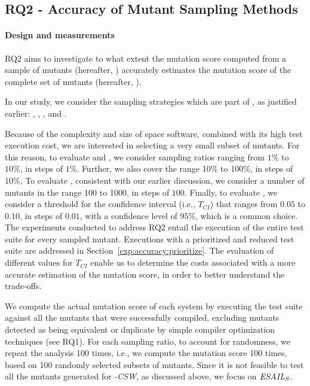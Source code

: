 \subsection{RQ2 - Accuracy of Mutant Sampling Methods}
\label{sec:RQ2}
\paragraph{Design and measurements}


RQ2 aims to investigate  
to what extent the mutation score computed from a sample of mutants (hereafter, ) accurately estimates the mutation score of the complete set of mutants (hereafter, ).

In our study, we consider the sampling strategies which are part of \APPR, as justified earlier: , ,  , and . 


Because of the complexity and size of space software, combined with its high test execution cost, we are interested in selecting a very small subset of mutants. 
For this reason, 
to evaluate   and ,
we consider sampling ratios ranging from $1\%$ to $10\%$, in steps of $1\%$. Further,
 we also cover the range 10\% to 100\%, in steps of $10\%$. To evaluate  , consistent with our earlier discussion, we consider a number of mutants in the range 100 to 1000, in steps of $100$.
Finally, to evaluate , we consider a threshold for the confidence interval (i.e., $T_{\mathit{CI}}$) that ranges from $0.05$ to $0.10$, in steps of $0.01$, with a confidence level of $95\%$, which is a common choice. The experiments conducted to address RQ2 entail the execution of the entire test suite for every sampled mutant. Executions with a prioritized and reduced test suite are addressed in Section~\ref{exp:accuracy:prioritize}. The evaluation of different values for $T_{\mathit{CI}}$ enable us to determine the costs associated with a more accurate estimation of the mutation score, in order to better understand the trade-offs.


We compute the actual mutation score of each system by executing the test suite against all the mutants that were successfully compiled, excluding mutants detected as being equivalent or duplicate by simple compiler optimization techniques (see RQ1). 
For each sampling ratio, to account for randomness,
we repeat the analysis 100 times, i.e., we compute the mutation score 100 times, based on 100 randomly selected subsets of mutants.
Since it is not feasible to test all the mutants generated for \SAIL{}\emph{-CSW}, as discussed above, we focus on $\mathit{\emph{ESAIL}{}}_{S}$.



